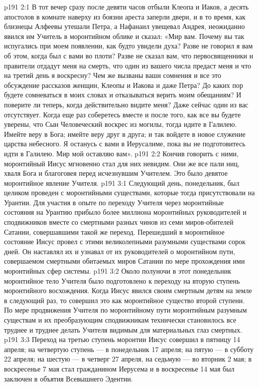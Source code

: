 \vs p191 2:1 В тот вечер сразу после девяти часов отбыли Клеопа и Иаков, а десять апостолов в комнате наверху из боязни ареста заперли двери, и в то время, как близнецы Алфеевы утешали Петра, а Нафанаил увещевал Андрея, неожиданно явился им Учитель в моронтийном облике и сказал: «Мир вам. Почему вы так испугались при моем появлении, как будто увидели духа? Разве не говорил я вам об этом, когда был с вами во плоти? Разве не сказал вам, что первосвященники и правители отдадут меня на смерть, что один из вашего числа предаст меня и что на третий день я воскресну? Чем же вызваны ваши сомнения и все это обсуждение рассказов женщин, Клеопы и Иакова и даже Петра? До каких пор будете сомневаться в моих словах и отказываться верить моим обещаниям? И поверите ли теперь, когда действительно видите меня? Даже сейчас один из вас отсутствует. Когда еще раз соберетесь вместе и после того, как все вы будете уверены, что Сын Человеческий воскрес из могилы, тогда идите в Галилею. Имейте веру в Бога; имейте веру друг в друга; и так войдете в новое служение царства небесного. Я останусь с вами в Иерусалиме, пока вы не подготовитесь идти в Галилею. Мир мой оставляю вам».
\vs p191 2:2 Кончив говорить с ними, моронтийный Иисус мгновенно стал для них невидим. Они же все пали ниц, хваля Бога и благоговея перед исчезнувшим Учителем. Это было девятое моронтийное явление Учителя.
\vs p191 3:1 Следующий день, понедельник, был целиком проведен с моронтийными существами, которые тогда присутствовали на Урантии. Для участия в опыте по переходу Учителя через моронтийные состояния на Урантию прибыло более миллиона моронтийных руководителей и сподвижников вместе со смертными разных чинов из семи миров\hyp{}обителей Сатании, совершавшими такой же переход. Перешедший в моронтийное состояние Иисус провел с этими великолепными разумными существами сорок дней. Он наставлял их и узнавал от их руководителей о моронтийном пути, совершаемом смертными обитаемых миров Сатании по мере прохождения ими моронтийных сфер системы.
\vs p191 3:2 Около полуночи в этот понедельник моронтийное тело Учителя было подготовлено к переходу на вторую ступень моронтийного восхождения. Когда Иисус явился своим смертным детям на земле в следующий раз, то совершил это как моронтийное существо второй ступени. По мере продвижения Учителя по моронтийному пути моронтийным разумным существам и их преобразующим сподвижникам технически становилось все труднее и труднее делать Учителя видимым для материальных глаз смертных.
\vs p191 3:3 Переход на третью ступень моронтии Иисус совершил в пятницу 14 апреля; на четвертую ступень --- в понедельник 17 апреля; на пятую --- в субботу 22 апреля; на шестую --- в четверг 27 апреля, на седьмую --- во вторник 2 мая; в воскресенье 7 мая стал гражданином Иерусема и в воскресенье 14 мая был заключен в объятия Всевышнего Эдентии.
